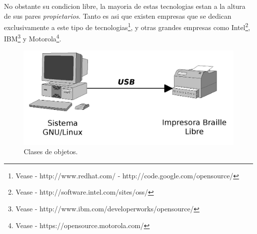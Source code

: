 No obstante su condicion libre, la mayoria de estas tecnologias estan a la
altura de sus pares \emph{propietarios}. Tanto es asi que existen empresas que
se dedican exclusivamente a este tipo de tecnologias\footnote{Vease -
http://www.redhat.com/ - http://code.google.com/opensource/}, y otras grandes
empresas como Intel\footnote{Vease - http://software.intel.com/sites/oss/},
IBM\footnote{Vease - http://www.ibm.com/developerworks/opensource/} y
Motorola\footnote{Vease - https://opensource.motorola.com/}. \\



\begin{figure}
\centering
\includegraphics[scale=0.25]{./img/pc_usb_printer.png}
\caption{Clases de objetos.}
\label{fig:conexion}
\end{figure}





